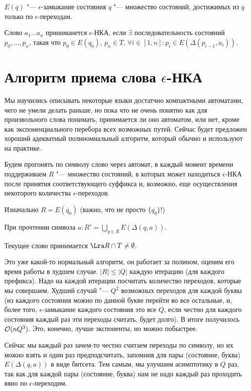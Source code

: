 \begin{Def}
$E(q)$ "--- $\epsilon$-замыкание состояния $q$ "--- множество состояний, достижимых из $q$ только по $\epsilon$-переходам.
\end{Def}


\begin{Def}
Слово $a_1 \dots a_n$ приниманется $\epsilon$-НКА, если $\exists$ последовательность состояний $p_0, \dots, p_n$, такая что
$p_0 \in E(q_0)$, $p_n \in T$, $\forall i \in [1, n]: p_i \in E(\Delta(p_{i-1}, a_i))$.
\end{Def}

\section{Алгоритм приема слова \texorpdfstring{$\epsilon$}{epsilon}-НКА}
Мы научились описывать некоторые языки достатчно компактными автоматами, чего не умели делать раньше, но пока что не очень понятно как для произвольного слова понимать, принимается ли оно автоматом, или нет,
кроме как экспоненциального перебора всех возможных путей. Сейчас будет предложен хороший адекватный полиномиальный алгоритм, который обычно и используют на практике.

Будем прогонять по символу слово через автомат, в каждый момент времени поддерживаем $R$ "---  множество состояний, в которых может находиться $\epsilon$-НКА после принятия соответствующего суффикса и,
возможно, еще осуществления некоторого количества $\epsilon$-переходов. 

Изначально $R = E(q_0)$ (важно, что не просто $\{q_0\}$!)

При прочтении символа $a\colon R' =  \bigcup\limits_{q \in R} E(\Delta(q, a))$.

Текущее слово принимается $\Lra R \cap T \neq \emptyset$.

Это уже какой-то нормальный алгоритм, он работает за полином, оценим его время работы в худшем случае.
$|R| \leqslant |Q|$ каждую итерацию (для каждого префикса). 
Надо на каждой итерации посчитать количество переходов, которые мы совершаем.
Худший случай "--- $Q^2$ возможных переходов для каждой буквы 
(из каждого состояния можно по данной букве перейти во все остальные, и, более того, $\epsilon$-замыкание каждого состояния это все $Q$, если честно для каждого состояния каждый раз эти переходы считать, будет долго).
В итоге получилось $\mathcal{O}(nQ^3)$. Это, конечно, лучше экспоненты, но можно побыстрее.

Сейчас мы каждый раз зачем-то честно считаем переходы по символу, но их можно взять и один раз предподсчитать, запомнив для пары (состояние, буква) $E(\Delta(q, a))$ в виде битсета. 
Тем самым, мы улучшим асимптотику в $Q$ раз, так как для каждой пары (состояние, буква) нам не надо каждый раз проходить явно по $\epsilon$-переходим.


